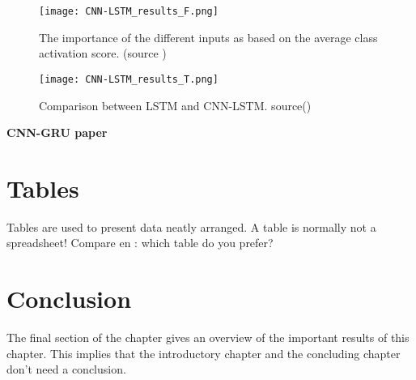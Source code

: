 \begin{figure}[h!]
	\centering
	\texttt{[image: CNN-LSTM\_results\_F.png]}
	\caption{The importance of the different inputs as based on the average class activation score. (source \cite{Kim2019})}
	\label{tab:LSTM_lit_results}
\end{figure}

\begin{figure}[h!]
	\centering
	\texttt{[image: CNN-LSTM\_results\_T.png]}
	\caption{Comparison between LSTM and CNN-LSTM. source(\cite{Kim2019})}
	\label{tab:LSTM_lit_results}
\end{figure}

\textbf{CNN-GRU paper}\\







\section{Tables}
Tables are used to present data neatly arranged. A table is normally
not a spreadsheet! Compare  en : which table do
you prefer?

%



\section{Conclusion}
The final section of the chapter gives an overview of the important results
of this chapter. This implies that the introductory chapter and the
concluding chapter don't need a conclusion.



